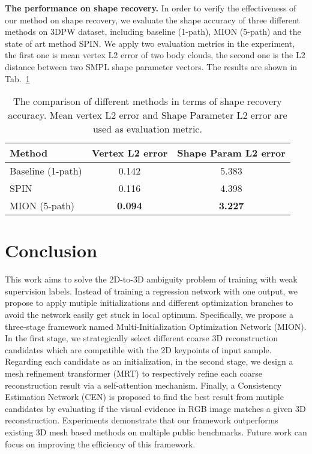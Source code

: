 \documentclass[sigconf]{acmart}
\begin{document}
\textbf{The performance on shape recovery. } In order to verify the effectiveness of our method on shape recovery, 
we evaluate the shape accuracy of three different methods on 3DPW dataset, including baseline (1-path), MION (5-path) and the 
state of art method SPIN. We apply two evaluation metrics in the experiment, the first one is mean vertex L2 error of two body clouds, 
the second one is the L2 distance between two SMPL shape parameter vectors. The results are shown in Tab.~\ref{table_compare_shape}


\begin{table}[t]
	\centering
	
	\begin{tabular}{lcc}
		\toprule
		Method   & Vertex L2 error & Shape Param L2 error \\
		\midrule
		Baseline (1-path)   & 0.142 &  5.383  \\
		SPIN   & 0.116 & 4.398 \\
		MION (5-path)   & \textbf{0.094} & \textbf{3.227} \\

		\bottomrule
	\end{tabular}
	\vspace{1em}
	\caption{The comparison of different methods in terms of shape recovery accuracy. Mean vertex L2 error and Shape Parameter L2 error 
		are used as evaluation metric.}
	\label{table_compare_shape}
\end{table}




\section{Conclusion} \label{conclusion}

This work aims to solve the 2D-to-3D ambiguity problem of training with weak supervision labels. 
Instead of training a regression network with one output, we propose to apply mutiple initializations and different 
optimization branches to avoid the network easily get stuck in local optimum. Specifically, 
we propose a three-stage framework named Multi-Initialization Optimization Network (MION). 
In the first stage, we strategically select different coarse 3D reconstruction 
candidates which are compatible with the 2D keypoints of input sample.  Regarding each candidate as 
an initialization, in the second stage, we design a mesh refinement transformer (MRT) to respectively
refine each coarse reconstruction result via a self-attention mechanism. Finally, a Consistency Estimation 
Network (CEN) is proposed to find the best result from mutiple candidates by evaluating 
if the visual evidence in RGB image matches a given 3D reconstruction. Experiments demonstrate that our framework 
outperforms existing 3D mesh based methods on multiple public benchmarks.  Future work can focus on improving the efficiency 
of this framework. 
\end{document}
